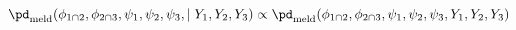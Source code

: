 \begin{equation}
  \pd_{\text{meld}} (\phi_{1 \cap 2}, \phi_{2 \cap 3}, \psi_{1}, \psi_{2}, \psi_{3}, \mid Y_{1}, Y_{2}, Y_{3})
  \propto
  \pd_{\text{meld}} (\phi_{1 \cap 2}, \phi_{2 \cap 3}, \psi_{1}, \psi_{2}, \psi_{3}, Y_{1}, Y_{2}, Y_{3})
  \label{eqn:melded-posterior}
\end{equation}